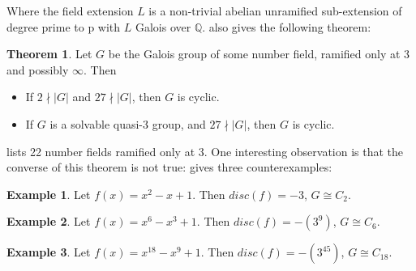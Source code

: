\documentclass[12pt]{extarticle}
\newcommand{\<}{\langle}
\renewcommand{\>}{\rangle}
\theoremstyle{definition}
\newtheorem{theorem}{Theorem}
\newtheorem*{example}{Example}
\begin{document}
\par
Where the field extension $L$ is a non-trivial abelian unramified sub-extension of degree prime to p with $L$ Galois over $\mathbb{Q}$.
\cite{HOEL} also gives the following theorem: 
\begin{theorem}
Let $G$ be the Galois group of some number field, ramified only at 3 and possibly $\infty$. Then \begin{itemize}
\item If $2 \nmid |G|$ and $ 27 \nmid |G|$, then $G$ is cyclic.
\item If $G$ is a solvable quasi-3 group, and $ 27 \nmid |G|$, then $G$ is cyclic.
\end{itemize}
\end{theorem}
\cite{JONE2} lists 22 number fields ramified only at 3. One interesting observation is that the converse of this theorem is not true: \cite{JONE2} gives three counterexamples: 
\begin{example}
Let $f(x) = x^2-x+1$. Then $disc(f) = -3$, $G \cong C_2$.
\end{example}
\begin{example}
Let $f(x) = x^6-x^3+1$. Then $disc(f) = -(3^9)$, $G \cong C_6$.
\end{example}
\begin{example}
Let $f(x) = x^{18}-x^9+1$. Then $disc(f) = -(3^{45})$, $G \cong C_{18}$.
\end{example}
\end{document}
